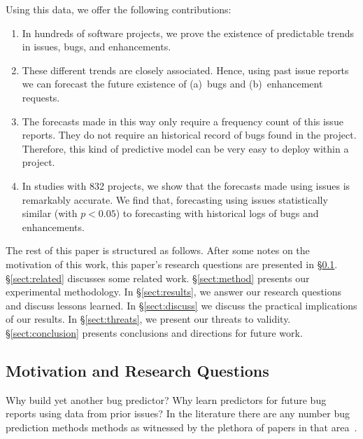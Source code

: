 \documentclass[sigconf, preprint]{acmart}
\newcommand{\be}{\begin{enumerate}}
\newcommand{\ee}{\end{enumerate}}
\newcommand{\tion}[1]{\S\ref{sect:#1}}
\begin{document}
Using this data, we offer the following contributions:
\be
\item In hundreds of software projects, we prove the existence of predictable 
trends in issues, bugs, and enhancements.
\item These different trends are closely associated. Hence, using past issue 
reports we can forecast the future existence of (a)~bugs and (b)~enhancement 
requests.
\item The forecasts made in this way only require  a frequency count of this 
issue reports. They do not require an historical record of bugs found in the 
project. Therefore, this kind of predictive model can be very easy to deploy 
within 
a project.
\item
In studies with 832 projects, we show that the forecasts made using issues is 
remarkably accurate. We find that, forecasting using issues statistically 
similar (with $p<0.05$) to 
forecasting with historical logs of bugs and enhancements.
\ee
The rest of this paper is structured as follows. 
 After some notes on the    motivation of this work, this paper's   research questions are presented  in \S\ref{mr}.   \tion{related}  discusses some   related work.   \tion{method} presents our experimental methodology. In 
\tion{results}, we answer our research questions and discuss  lessons learned. In \tion{discuss} we discuss the practical implications of our results. In \tion{threats}, we present our threats to validity.  
 \tion{conclusion} presents   conclusions and directions for future work.


\subsection{Motivation and Research Questions}
\label{mr}
Why build yet another bug predictor? Why learn predictors for future bug reports using
data from prior issues? In the literature there are any number bug prediction 
methods 
methods as witnessed by the plethora of papers in that area~\cite{krishna2017less, krishna2016too, menzies2007data, turhan2009relative, menzies2010defect}. 
\end{document}
